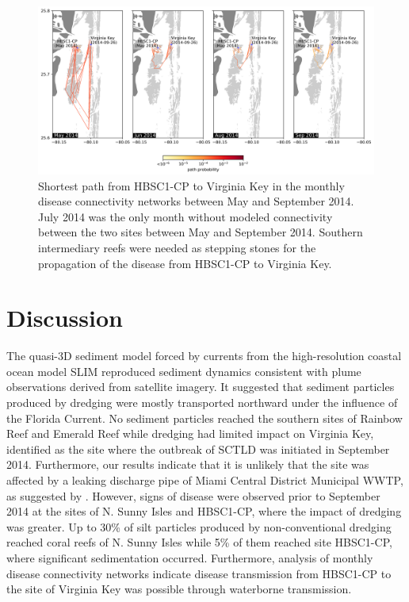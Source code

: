\documentclass[preprint,12pt,authoryear]{elsarticle}
\begin{document}
\begin{figure}
    \centering
    \includegraphics[width=\textwidth]{figures/fig_paths.png}
    \caption{Shortest path from HBSC1-CP to Virginia Key in the monthly disease connectivity networks between May and September 2014. July 2014 was the only month without modeled connectivity between the two sites between May and September 2014. Southern intermediary reefs were needed as stepping stones for the propagation of the disease from HBSC1-CP to Virginia Key.}
    \label{fig:onset_path}
\end{figure}

\section{Discussion}

The quasi-3D sediment model forced by currents from the high-resolution coastal ocean model SLIM reproduced sediment dynamics consistent with plume observations derived from satellite imagery. It suggested that sediment particles produced by dredging were mostly transported northward under the influence of the Florida Current. No sediment particles reached the southern sites of Rainbow Reef and Emerald Reef while dredging had limited impact on Virginia Key, identified as the site where the outbreak of SCTLD was initiated in September 2014. Furthermore, our results indicate that it is unlikely that the site was affected by a leaking discharge pipe of Miami Central District Municipal WWTP, as suggested by \cite{gintert2019regional}. However, signs of disease were observed prior to September 2014 at the sites of N. Sunny Isles and HBSC1-CP, where the impact of dredging was greater. Up to 30\% of silt particles produced by non-conventional dredging reached coral reefs of N. Sunny Isles while 5\% of them reached site HBSC1-CP, where significant sedimentation occurred. Furthermore, analysis of monthly disease connectivity networks indicate disease transmission from HBSC1-CP to the site of Virginia Key was possible through waterborne transmission.   
\end{document}
